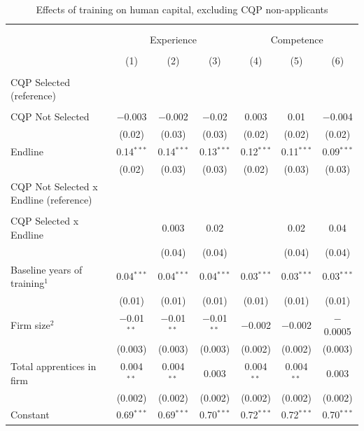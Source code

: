 \documentclass[
  a4paper, twoside, 12pt]{book}
\begin{document}
\begin{singlespacing}

\begin{table}[H] \centering 
  \caption{Effects of training on human capital, excluding CQP non-applicants} 
  \label{tab:tbl-appreg2} 
\scriptsize 
\begin{tabular}{@{\extracolsep{-4pt}}lcccccc} 
\\[-1.8ex]\hline 
\hline \\[-1.8ex] 
\\[-1.8ex] & \multicolumn{3}{c}{Experience} & \multicolumn{3}{c}{Competence} \\ 
\\[-1.8ex] & (1) & (2) & (3) & (4) & (5) & (6)\\ 
\hline \\[-1.8ex] 
 CQP Selected (reference) \\ \\ CQP Not Selected & $-$0.003 & $-$0.002 & $-$0.02 & 0.003 & 0.01 & $-$0.004 \\ 
  & (0.02) & (0.03) & (0.03) & (0.02) & (0.02) & (0.02) \\ 
  Endline & 0.14$^{***}$ & 0.14$^{***}$ & 0.13$^{***}$ & 0.12$^{***}$ & 0.11$^{***}$ & 0.09$^{***}$ \\ 
  & (0.02) & (0.03) & (0.03) & (0.02) & (0.03) & (0.03) \\ 
  CQP Not Selected x Endline (reference) \\ \\ CQP Selected x Endline &  & 0.003 & 0.02 &  & 0.02 & 0.04 \\ 
  &  & (0.04) & (0.04) &  & (0.04) & (0.04) \\ 
  Baseline years of training$^1$ & 0.04$^{***}$ & 0.04$^{***}$ & 0.04$^{***}$ & 0.03$^{***}$ & 0.03$^{***}$ & 0.03$^{***}$ \\ 
  & (0.01) & (0.01) & (0.01) & (0.01) & (0.01) & (0.01) \\ 
  Firm size$^2$ & $-$0.01$^{**}$ & $-$0.01$^{**}$ & $-$0.01$^{**}$ & $-$0.002 & $-$0.002 & $-$0.0005 \\ 
  & (0.003) & (0.003) & (0.003) & (0.002) & (0.002) & (0.003) \\ 
  Total apprentices in firm & 0.004$^{**}$ & 0.004$^{**}$ & 0.003 & 0.004$^{**}$ & 0.004$^{**}$ & 0.003 \\ 
  & (0.002) & (0.002) & (0.002) & (0.002) & (0.002) & (0.002) \\ 
  Constant & 0.69$^{***}$ & 0.69$^{***}$ & 0.70$^{***}$ & 0.72$^{***}$ & 0.72$^{***}$ & 0.70$^{***}$ \\ 

\end{tabular}
\end{table}
\end{singlespacing}
\end{document}
